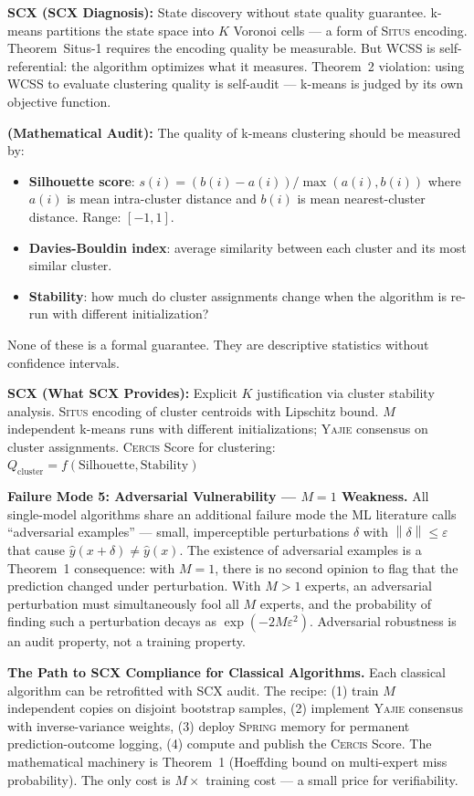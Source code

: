 \documentclass[12pt,a4paper]{article}
\theoremstyle{definition}
\newcommand{\Situs}{\textsc{Situs}}
\newcommand{\Yajie}{\textsc{Yajie}}
\newcommand{\Spring}{\textsc{Spring}}
\newcommand{\Cercis}{\textsc{Cercis}}
\newcommand{\SCX}{\textsc{SCX}}
\newcommand{\norm}[1]{\left\lVert#1\right\rVert}
\newcommand{\whatMissing}{\noindent\textbf{SCX (What SCX Provides):} }
\newcommand{\diagnosis}{\noindent\textbf{SCX (SCX Diagnosis):} }
\newcommand{\mathAudit}{\noindent\textbf{ (Mathematical Audit):} }
\begin{document}
\diagnosis{} State discovery without state quality guarantee. k-means partitions the state space into $K$ Voronoi cells — a form of \Situs{} encoding. Theorem~Situs-1 requires the encoding quality be measurable. But WCSS is self-referential: the algorithm optimizes what it measures. Theorem~2 violation: using WCSS to evaluate clustering quality is self-audit — k-means is judged by its own objective function.

\mathAudit{} The quality of k-means clustering should be measured by:
\begin{itemize}[nosep]
    \item \textbf{Silhouette score}: $s(i) = (b(i) - a(i)) / \max(a(i), b(i))$ where $a(i)$ is mean intra-cluster distance and $b(i)$ is mean nearest-cluster distance. Range: $[-1, 1]$.
    \item \textbf{Davies-Bouldin index}: average similarity between each cluster and its most similar cluster.
    \item \textbf{Stability}: how much do cluster assignments change when the algorithm is re-run with different initialization?
\end{itemize}
None of these is a formal guarantee. They are descriptive statistics without confidence intervals.

\whatMissing{} Explicit $K$ justification via cluster stability analysis. \Situs{} encoding of cluster centroids with Lipschitz bound. $M$ independent k-means runs with different initializations; \Yajie{} consensus on cluster assignments. \Cercis{} Score for clustering: $Q_{\text{cluster}} = f(\text{Silhouette}, \text{Stability})$

\noindent\textbf{Failure Mode 5: Adversarial Vulnerability — $M=1$ Weakness.} All single-model algorithms share an additional failure mode the ML literature calls ``adversarial examples'' — small, imperceptible perturbations $\delta$ with $\norm{\delta} \le \varepsilon$ that cause $\hat{y}(x+\delta) \neq \hat{y}(x)$. The existence of adversarial examples is a Theorem~1 consequence: with $M=1$, there is no second opinion to flag that the prediction changed under perturbation. With $M>1$ experts, an adversarial perturbation must simultaneously fool all $M$ experts, and the probability of finding such a perturbation decays as $\exp(-2M\varepsilon^2)$. Adversarial robustness is an audit property, not a training property.

\noindent\textbf{The Path to SCX Compliance for Classical Algorithms.} Each classical algorithm can be retrofitted with \SCX{} audit. The recipe: (1) train $M$ independent copies on disjoint bootstrap samples, (2) implement \Yajie{} consensus with inverse-variance weights, (3) deploy \Spring{} memory for permanent prediction-outcome logging, (4) compute and publish the \Cercis{} Score. The mathematical machinery is Theorem~1 (Hoeffding bound on multi-expert miss probability). The only cost is $M \times$ training cost — a small price for verifiability.
\end{document}
